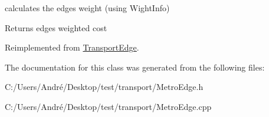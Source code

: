 calculates the edge\textquotesingle{}s weight (using Wight\+Info) 

\begin{DoxyReturn}{Returns}
edge\textquotesingle{}s weighted cost 
\end{DoxyReturn}


Reimplemented from \hyperlink{class_transport_edge_ad2b8f66adec9223e97752ae1fb621c0e}{Transport\+Edge}.



The documentation for this class was generated from the following files\+:\begin{DoxyCompactItemize}
\item 
C\+:/\+Users/\+André/\+Desktop/test/transport/Metro\+Edge.\+h\item 
C\+:/\+Users/\+André/\+Desktop/test/transport/Metro\+Edge.\+cpp\end{DoxyCompactItemize}
